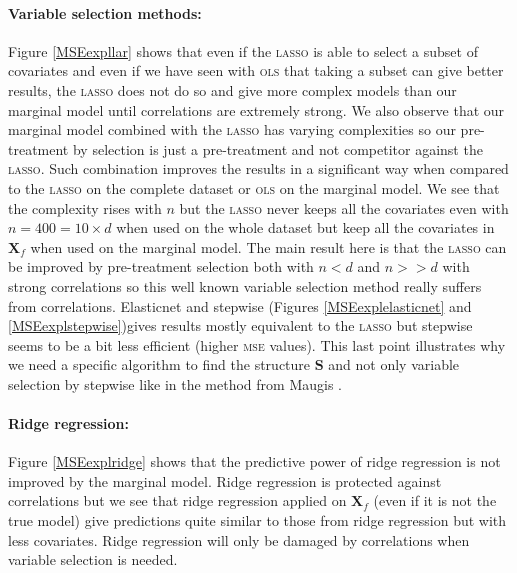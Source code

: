 \documentclass[12pt,a4paper]{report}
\begin{document}
\paragraph{Variable selection methods:} Figure \ref{MSEexpllar} shows that even if the \textsc{lasso} is able to select a subset of covariates and even if we have seen with \textsc{ols} that taking a subset can give better results, the \textsc{lasso} does not do so and give more complex models than our marginal model until correlations are extremely strong. We also observe that our marginal model combined with the \textsc{lasso} has varying complexities so our pre-treatment by selection is just a pre-treatment and not competitor against the \textsc{lasso}. Such combination improves the results in a significant way when compared to the \textsc{lasso} on the complete dataset or \textsc{ols} on the marginal model. We see that the complexity rises with $n$ but the \textsc{lasso} never keeps all the covariates even with $n=400=10\times d$ when used on the whole dataset but keep all the covariates in $\boldsymbol{X}_f$ when used on the marginal model. The main result here is that the \textsc{lasso} can be improved by pre-treatment selection both with $n<d$ and $n>>d$ with strong correlations so this well known variable selection method really suffers from correlations. Elasticnet and stepwise (Figures \ref{MSEexplelasticnet} and \ref{MSEexplstepwise})gives results mostly equivalent to the \textsc{lasso} but stepwise seems to be a bit less efficient (higher \textsc{mse} values). This last point illustrates why we need a specific algorithm to find the structure $\boldsymbol{S}$ and not only variable selection by stepwise like in the method from Maugis \cite{maugis2009variable}. \\

\paragraph{Ridge regression:} Figure \ref{MSEexplridge} shows that the predictive power of ridge regression is not improved by the marginal model. Ridge regression is protected against correlations but we see that ridge regression applied on $\boldsymbol{X}_f$ (even if it is not the true model) give predictions quite similar to those from ridge regression but with less covariates. Ridge regression will only be damaged by correlations when variable selection is needed. \\


	\FloatBarrier
\end{document}
